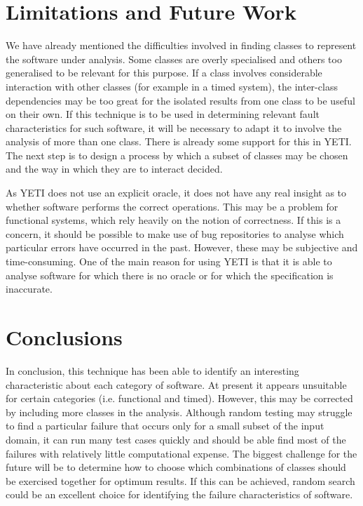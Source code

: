\documentclass[runningheads,a4paper]{llncs}
\begin{document}
\section{Limitations and Future Work}
We have already mentioned the difficulties involved in finding classes to represent the software under analysis. Some classes are overly specialised and others too generalised to be relevant for this purpose. If a class involves considerable interaction with other classes (for example in a timed system), the inter-class dependencies may be too great for the isolated results from one class to be useful on their own. If this technique is to be used in determining relevant fault characteristics for such software, it will be necessary to adapt it to involve the analysis of more than one class. There is already some support for this in YETI. The next step is to design a process by which a subset of classes may be chosen and the way in which they are to interact decided.

As YETI does not use an explicit oracle, it does not have any real insight as to whether software performs the correct operations. This may be a problem for functional systems, which rely heavily on the notion of correctness. If this is a concern, it should be possible to make use of bug repositories to analyse which particular errors have occurred in the past. However, these may be subjective and time-consuming. One of the main reason for using YETI is that it is able to analyse software for which there is no oracle or for which the specification is inaccurate.

\section{Conclusions}
In conclusion, this technique has been able to identify an interesting characteristic about each category of software. At present it appears unsuitable for certain categories (i.e. functional and timed). However, this may be corrected by including more classes in the analysis. Although random testing may struggle to find a particular failure that occurs only for a small subset of the input domain, it can run many test cases quickly and should be able find most of the failures with relatively little computational expense. The biggest challenge for the future will be to determine how to choose which combinations of classes should be exercised together for optimum results. If this can be achieved, random search could be an excellent choice for identifying the failure characteristics of software.
\end{document}
